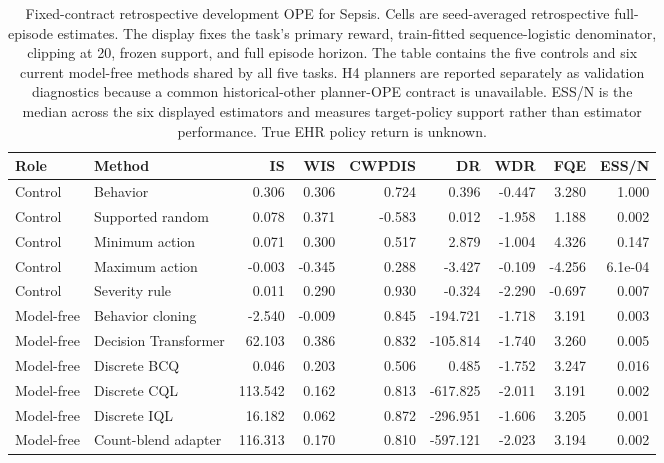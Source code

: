 \begin{table}[p]
\centering
\caption{Fixed-contract retrospective development OPE for Sepsis. Cells are seed-averaged retrospective full-episode estimates. The display fixes the task's primary reward, train-fitted sequence-logistic denominator, clipping at 20, frozen support, and full episode horizon. The table contains the five controls and six current model-free methods shared by all five tasks. H4 planners are reported separately as validation diagnostics because a common historical-other planner-OPE contract is unavailable. ESS/N is the median across the six displayed estimators and measures target-policy support rather than estimator performance. True EHR policy return is unknown.}
\label{tab:ope-estimator-sepsis}
\scriptsize
\setlength{\tabcolsep}{3.6pt}
\begin{tabular}{llrrrrrrr}
\toprule
Role & Method & IS & WIS & CWPDIS & DR & WDR & FQE & ESS/N \\
\midrule
Control & Behavior & 0.306 & 0.306 & 0.724 & 0.396 & -0.447 & 3.280 & 1.000 \\
Control & Supported random & 0.078 & 0.371 & -0.583 & 0.012 & -1.958 & 1.188 & 0.002 \\
Control & Minimum action & 0.071 & 0.300 & 0.517 & 2.879 & -1.004 & 4.326 & 0.147 \\
Control & Maximum action & -0.003 & -0.345 & 0.288 & -3.427 & -0.109 & -4.256 & 6.1e-04 \\
Control & Severity rule & 0.011 & 0.290 & 0.930 & -0.324 & -2.290 & -0.697 & 0.007 \\
\midrule
Model-free & Behavior cloning & -2.540 & -0.009 & 0.845 & -194.721 & -1.718 & 3.191 & 0.003 \\
Model-free & Decision Transformer & 62.103 & 0.386 & 0.832 & -105.814 & -1.740 & 3.260 & 0.005 \\
Model-free & Discrete BCQ & 0.046 & 0.203 & 0.506 & 0.485 & -1.752 & 3.247 & 0.016 \\
Model-free & Discrete CQL & 113.542 & 0.162 & 0.813 & -617.825 & -2.011 & 3.191 & 0.002 \\
Model-free & Discrete IQL & 16.182 & 0.062 & 0.872 & -296.951 & -1.606 & 3.205 & 0.001 \\
Model-free & Count-blend adapter & 116.313 & 0.170 & 0.810 & -597.121 & -2.023 & 3.194 & 0.002 \\
\bottomrule
\end{tabular}
\end{table}

